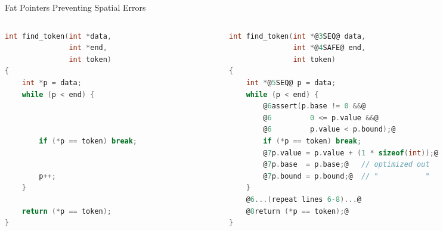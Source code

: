 \documentclass[aspectratio=169]{beamer}
\begin{document}
\begin{frame}[fragile]{Fat Pointers Preventing Spatial Errors}
    \begin{columns}[T]
      \begin{column}{0.44\textwidth}
\begin{lstlisting}[language=C,mathescape,basicstyle={\scriptsize\ttfamily}]
int find_token(int *data,
               int *end,
               int token)
{
    int *p = data;
    while (p < end) {



        if (*p == token) break;


        p++;
    }

    return (*p == token);
}
\end{lstlisting}
\end{column}

\pause

\begin{column}{0.56\textwidth}

\begin{lstlisting}[language=C,mathescape,basicstyle={\scriptsize\ttfamily},
    moredelim={**[is][\btHL<3>]{@3}{@}},
    moredelim={**[is][{\btHL<4>}]{@4}{@}},
    moredelim={**[is][{\btHL<5>}]{@5}{@}},
    moredelim={**[is][{\btHL<6>}]{@6}{@}},
    moredelim={**[is][{\btHL<7>}]{@7}{@}},
    moredelim={**[is][{\btHL<8>}]{@8}{@}}
]
int find_token(int *@3SEQ@ data,
               int *@4SAFE@ end,
               int token)
{
    int *@5SEQ@ p = data;
    while (p < end) {
        @6assert(p.base != 0 &&@
        @6         0 <= p.value &&@
        @6         p.value < p.bound);@
        if (*p == token) break;
        @7p.value = p.value + (1 * sizeof(int));@
        @7p.base  = p.base;@   // optimized out
        @7p.bound = p.bound;@  // "           "
    }
    @6...(repeat lines 6-8)...@
    @8return (*p == token);@
}
\end{lstlisting}
\end{column}

\end{columns}
\end{frame}
\end{document}
